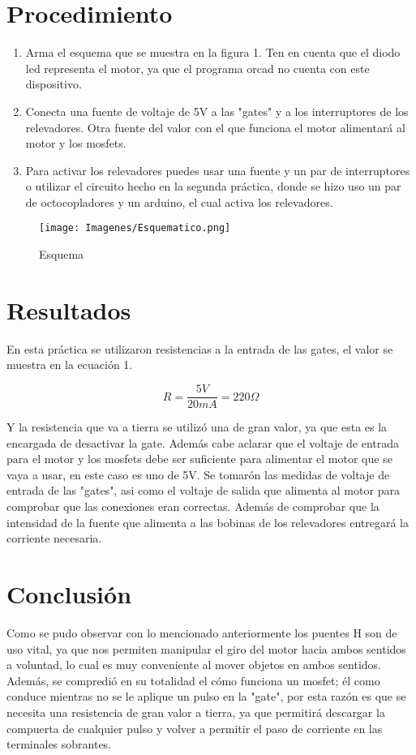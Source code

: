 \documentclass[letterpaper]{article}
\begin{document}
\section{Procedimiento}
\begin{enumerate}
    \item Arma el esquema que se muestra en la figura 1. Ten en cuenta que el diodo led representa el motor, ya que el programa orcad no cuenta con este dispositivo.
    \item Conecta una fuente de voltaje de 5V a las "gates" y a los interruptores de los relevadores. Otra fuente del valor con el que funciona el motor alimentará al motor y los mosfets. 
    \item Para activar los relevadores puedes usar una fuente y un par de interruptores o utilizar el circuito hecho en la segunda práctica, donde se hizo uso un par de octocopladores y un arduino, el cual activa los relevadores.
\end{enumerate}

\newpage
\begin{figure}
        \centering
        \texttt{[image: Imagenes/Esquematico.png]}
        \caption{Esquema}
        \label{fig:my_label}
    \end{figure}

\section{Resultados}
En esta práctica se utilizaron resistencias a la entrada de las gates, el valor se muestra en la ecuación 1.
\begin{center}
    \begin{equation}
        R = \frac{5V}{20mA} = 220\Omega
    \end{equation}
\end{center}
Y la resistencia que va a tierra se utilizó una de gran valor, ya que esta es la encargada de desactivar la gate.
Además cabe aclarar que el voltaje de entrada para el motor y los mosfets debe ser suficiente para alimentar el motor que se vaya a usar, en este caso es uno de 5V.
Se tomarón las medidas de voltaje de entrada de las "gates", asi como el voltaje de salida que alimenta al motor para comprobar que las conexiones eran correctas. Además de comprobar que la intensidad de la fuente que alimenta a las bobinas de los relevadores entregará la corriente necesaria.


\section{Conclusión}
Como se pudo observar con lo mencionado anteriormente los puentes H son de uso vital, ya que nos permiten manipular el giro del motor hacia ambos sentidos a voluntad, lo cual es muy conveniente al mover objetos en ambos sentidos. Además, se compredió en su totalidad el cómo funciona un mosfet; él como conduce mientras no se le aplique un pulso en la "gate", por esta razón es que se necesita una resistencia de gran valor a tierra, ya que permitirá descargar la compuerta de cualquier pulso y volver a permitir el paso de corriente en las terminales sobrantes.
\end{document}
